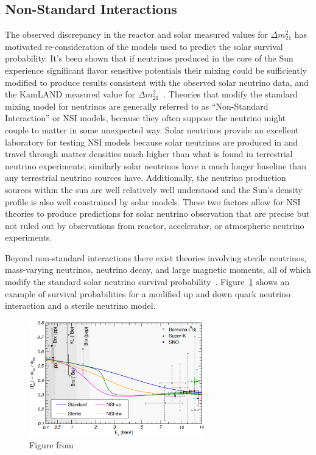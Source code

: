 \subsection{Non-Standard Interactions}
\label{sec:nsi}
The observed discrepancy in the reactor and solar measured values for $\Delta m^{2}_{21}$
has motivated re-consideration of the models used to predict the solar survival
probability.
It's been shown that if neutrinos produced in the core of the Sun experience
significant flavor sensitive potentials their mixing could be sufficiently modified
to produce results consistent with the observed solar neutrino data, and
the KamLAND measured value for $\Delta m^{2}_{21}$~\citep{richie_nsi,mavans_nsi, nsi_friedland}.
Theories that modify the standard mixing model for neutrinos are generally
referred to as ``Non-Standard Interaction'' or NSI models, because
they often suppose the neutrino might couple to matter in some unexpected way.
Solar neutrinos provide an excellent laboratory for testing NSI models
because solar neutrinos are produced in and travel through matter densities much
higher than what is found in terrestrial neutrino experiments;
similarly solar neutrinos have a much longer baseline than any terrestrial
neutrino sources have.
Additionally, the neutrino production sources within the sun are well
relatively well understood and the Sun's density profile is also well
constrained by solar models.
These two factors allow for NSI theories to produce predictions for solar
neutrino observation that are precise but not ruled out by observations from
reactor, accelerator, or atmospheric neutrino experiments.

Beyond non-standard interactions there exist theories involving sterile neutrinos,
mass-varying neutrinos, neutrino decay, and large magnetic moments, all of
which modify the standard solar neutrino survival probability~\citep{maltoni_solar, richie_nsi}.
Figure~\ref{fig:maltoni_mixing} shows an example of survival probabilities
for a modified up and down quark neutrino interaction and a sterile neutrino
model.

\begin{figure}[htbp]
\centering
\includegraphics[width=0.68\textwidth]{maltoni_mixing}
\caption[]{Figure from~\citep{maltoni_solar}}
\label{fig:maltoni_mixing}
\end{figure}

